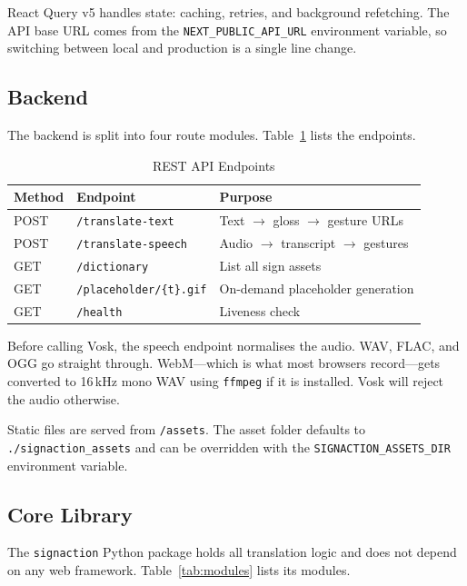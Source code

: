 \documentclass[conference]{IEEEtran}
\begin{document}
React Query v5 handles state: caching, retries, and background refetching. The API base URL comes from the \texttt{NEXT\_PUBLIC\_API\_URL} environment variable, so switching between local and production is a single line change.

\subsection{Backend}

The backend is split into four route modules. Table~\ref{tab:routes} lists the endpoints.

\begin{table}[t]
\centering
\caption{REST API Endpoints}
\label{tab:routes}
\begin{tabular}{@{}lll@{}}
\toprule
\textbf{Method} & \textbf{Endpoint} & \textbf{Purpose} \\
\midrule
POST & \texttt{/translate-text} & Text $\rightarrow$ gloss $\rightarrow$ gesture URLs \\
POST & \texttt{/translate-speech} & Audio $\rightarrow$ transcript $\rightarrow$ gestures \\
GET & \texttt{/dictionary} & List all sign assets \\
GET & \texttt{/placeholder/\{t\}.gif} & On-demand placeholder generation \\
GET & \texttt{/health} & Liveness check \\
\bottomrule
\end{tabular}
\end{table}

Before calling Vosk, the speech endpoint normalises the audio. WAV, FLAC, and OGG go straight through. WebM---which is what most browsers record---gets converted to 16\,kHz mono WAV using \texttt{ffmpeg} if it is installed. Vosk will reject the audio otherwise.

Static files are served from \texttt{/assets}. The asset folder defaults to \texttt{./signaction\_assets} and can be overridden with the \texttt{SIGNACTION\_ASSETS\_DIR} environment variable.

\subsection{Core Library}

The \texttt{signaction} Python package holds all translation logic and does not depend on any web framework. Table~\ref{tab:modules} lists its modules.
\end{document}
